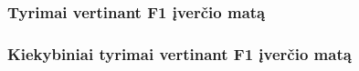 \documentclass{VUMIFInfMagistrinis}
\begin{document}
\subsubsection{Tyrimai vertinant F1 įverčio matą}


\subsubsection{Kiekybiniai tyrimai vertinant F1 įverčio matą}




\printbibliography[heading=bibintoc]  %

\appendix  %
\end{document}
